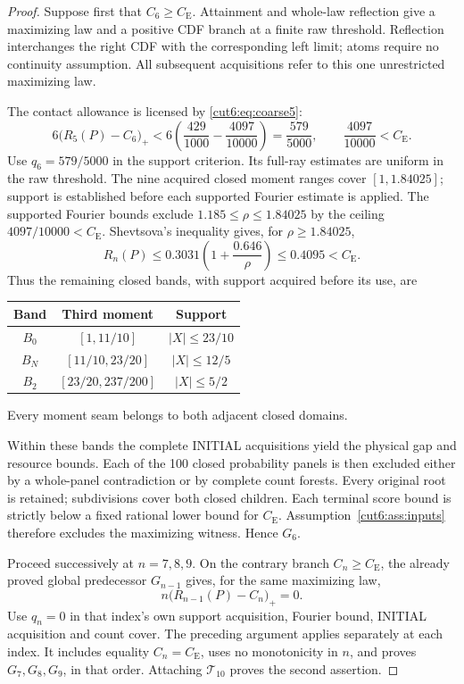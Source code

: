 \documentclass[11pt,a4paper]{article}
\theoremstyle{definition}
\newcommand{\CE}{C_{\mathrm E}}
\begin{document}
\begin{proof}
Suppose first that \(C_6\ge\CE\). Attainment and whole-law reflection
give a maximizing law and a positive CDF branch at a finite raw threshold.
Reflection interchanges the right CDF with the corresponding left limit;
atoms require no continuity assumption. All subsequent acquisitions
refer to this one unrestricted maximizing law.

The contact allowance is licensed by \eqref{cut6:eq:coarse5}:
\[
 6\bigl(R_5(P)-C_6\bigr)_+
 <6\left(\frac{429}{1000}-\frac{4097}{10000}\right)
 =\frac{579}{5000},
 \qquad \frac{4097}{10000}<\CE.
\]
Use \(q_6=579/5000\) in the support criterion. Its full-ray estimates
are uniform in the raw threshold. The nine acquired closed moment ranges
cover \([1,1.84025]\); support is established before each supported
Fourier estimate is applied.
The supported Fourier bounds exclude \(1.185\le\rho\le1.84025\)
by the ceiling \(4097/10000<\CE\). Shevtsova's inequality
\cite{S2013} gives, for \(\rho\ge1.84025\),
\[
 R_n(P)\le0.3031\left(1+\frac{0.646}{\rho}\right)
 \le0.4095<\CE.
\]
Thus the remaining closed bands, with support acquired before its use,
are
\begin{center}
\begin{tabular}{@{}ccc@{}}
\toprule
Band&Third moment&Support\\
\midrule
\(B_0\)&\([1,11/10]\)&\(|X|\le23/10\)\\
\(B_N\)&\([11/10,23/20]\)&\(|X|\le12/5\)\\
\(B_2\)&\([23/20,237/200]\)&\(|X|\le5/2\)\\
\bottomrule
\end{tabular}
\end{center}
Every moment seam belongs to both adjacent closed domains.

Within these bands the complete INITIAL acquisitions yield the physical
gap and resource bounds. Each of the 100 closed probability panels is
then excluded either by a whole-panel contradiction or by complete
count forests. Every original root is retained; subdivisions cover both
closed children. Each terminal score bound is strictly below a fixed
rational lower bound for \(\CE\). Assumption~\ref{cut6:ass:inputs}
therefore excludes the maximizing witness. Hence \(G_6\).

Proceed successively at \(n=7,8,9\). On the contrary branch
\(C_n\ge\CE\), the already proved global predecessor \(G_{n-1}\)
gives, for the same maximizing law,
\[
 n\bigl(R_{n-1}(P)-C_n\bigr)_+=0.
\]
Use \(q_n=0\) in that index's own support acquisition, Fourier bound,
INITIAL acquisition and count cover. The preceding argument applies
separately at each index. It includes equality \(C_n=\CE\), uses no
monotonicity in \(n\), and proves \(G_7,G_8,G_9\), in that order.
Attaching \(\mathcal T_{10}\) proves the second assertion.
\end{proof}
\end{document}
